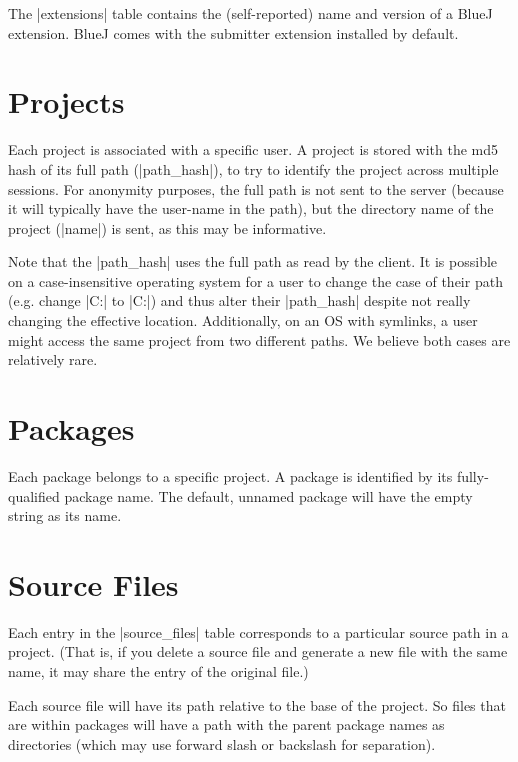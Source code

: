 \documentclass{report}
\begin{document}

The |extensions| table contains the (self-reported) name and version of a
BlueJ extension.  BlueJ comes with the submitter extension installed by default.

\section{Projects}


Each project is associated with a specific user.  A project is stored with the
md5 hash of its full path (|path_hash|), to try to identify the project across multiple
sessions.  For anonymity purposes, the full path is not sent to the server
(because it will typically have the user-name in the path), but the directory
name of the project (|name|) is sent, as this may be informative.

Note that the |path_hash| uses the full path as read by the client.  It is possible on
a case-insensitive operating system for a user to change the case of their path (e.g. change
|C:\BLUEJPROJ{}| to |C:\BlueJproj{}|) and thus alter their |path_hash| despite not
really changing the effective location.  Additionally, on an OS with symlinks, a user might
access the same project from two different paths.  We believe both cases are relatively rare.

\section{Packages}


Each package belongs to a specific project.  A package is identified by its
fully-qualified package name.  The default, unnamed package will have the
empty string as its name.

\section{Source Files}


Each entry in the |source_files| table corresponds to a particular
source path in a project.  (That is, if you delete a source file and
generate a new file with the same name, it may share the entry of the
original file.)

Each source file will have its path relative to the base of the
project.  So files that are within packages will have a path with the
parent package names as directories (which may use forward slash or
backslash for separation).
\end{document}
